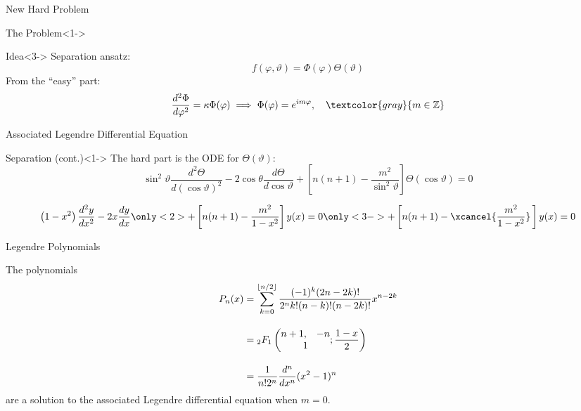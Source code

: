 \documentclass[xetex, onlymath, aspectratio=169]{beamer}
\begin{document}
\begin{frame}{New Hard Problem}
	\begin{block}{The Problem}<1->
		\only<1>{
			\[
				\nabla^2_s f(\varphi, \vartheta) = \lambda f(\varphi, \vartheta)
			\]
		}
		\only<2->{
			\[
  			\frac{1}{\sin\vartheta} \frac{\partial}{\partial \vartheta}
  					\left( \sin\vartheta \frac{\partial f}{\partial\vartheta} \right)
  					+ \frac{1}{\sin^2 \vartheta} \frac{\partial^2 f}{\partial\varphi^2}
  				= \lambda f(\varphi, \vartheta)
			\]
		}
	\end{block}
	\begin{alertblock}{Idea}<3->
		Separation ansatz:
		\[
			f(\varphi, \vartheta) = \Phi(\varphi) \Theta(\vartheta)
		\]
		From the ``easy'' part:
		\[
			\frac{d^2\Phi}{d\varphi^2} = \kappa \Phi(\varphi)
				\implies \Phi(\varphi) = e^{im\varphi},
				\quad \textcolor{gray}{m \in \mathbb{Z}}
		\]
	\end{alertblock}
\end{frame}

\begin{frame}{Associated Legendre Differential Equation}
	\begin{alertblock}{Separation (cont.)}<1->
  	The hard part is the ODE for \(\Theta(\vartheta)\):
  	\[
    	\sin^2\vartheta \frac{d^2 \Theta}{d (\cos\vartheta)^2} - 2\cos\theta \frac{d \Theta}{d \cos\vartheta}
        + \left[ n(n+1) - \frac{m^2}{\sin^2 \vartheta} \right] \Theta(\cos\vartheta) = 0
  	\]
	\end{alertblock}
	

	\begin{definition}
	  \[
      \left( 1 - x^2 \right) \frac{d^2 y}{dx^2} - 2x \frac{dy}{dx}
      	\only<2>{
        	+ \left[ n(n+1) - \frac{m^2}{1 - x^2} \right] y(x) = 0
				}
				\only<3->{
					+ \left[ n(n+1) - \xcancel{\frac{m^2}{1 - x^2}} \, \right] y(x) = 0
				}
  	\]
	\end{definition}
\end{frame}

\begin{frame}{Legendre Polynomials}
	\begin{definition}
		The polynomials
		\begin{align*}
  		P_n(x)
			&= \sum_{k=0}^{\lfloor n/2 \rfloor} 
        \frac{(-1)^k (2n-2k)!}{2^n k! (n-k)!(n-2k)!} x^{n-2k} \\[1em]
			&= {}_2F_1 \left( \begin{matrix}
        n + 1, & -n \\ \multicolumn{2}{c}{1}
        \end{matrix} ; \frac{1 - x}{2} \right) \\[1em]
      &= \frac{1}{n!2^n}\frac{d^n}{dx^n}(x^2-1)^n
    \end{align*}
  	are a solution to the associated Legendre differential equation when \(m = 0\).
	\end{definition}
\end{frame}
\end{document}
